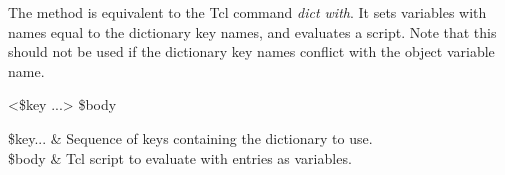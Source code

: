 \documentclass{article}
\begin{document}
The method  is equivalent to the Tcl command \textit{dict with}. 
It sets variables with names equal to the dictionary key names, and evaluates a script. 
Note that this should not be used if the dictionary key names conflict with the object variable name.
\begin{syntax}
 <\$key ...> \$body
\end{syntax}
\begin{args}
\$key... & Sequence of keys containing the dictionary to use. \\
\$body & Tcl script to evaluate with entries as variables.
\end{args}


\clearpage
\printindex
\end{document}
